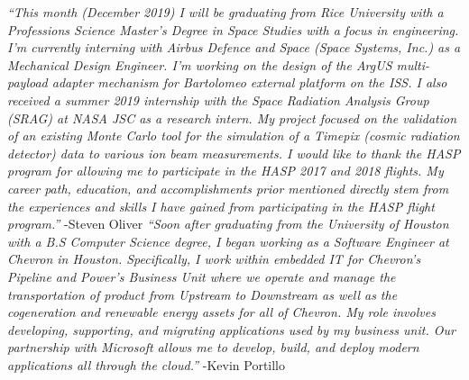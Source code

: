 \begin{appendices}
  \textit{``This month (December 2019) I will be graduating from Rice University with a Professions Science Master's Degree in Space Studies with a focus in engineering. I'm currently interning with Airbus Defence and Space (Space Systems, Inc.) as a Mechanical Design Engineer. I'm working on the design of the ArgUS multi-payload adapter mechanism for Bartolomeo external platform on the ISS. \newline
    I also received a summer 2019 internship with the Space Radiation Analysis Group (SRAG) at NASA JSC as a research intern. My project focused on the validation of an existing Monte Carlo tool for the simulation of a Timepix (cosmic radiation detector) data to various ion beam measurements. \newline
    I would like to thank the HASP program for allowing me to participate in the HASP 2017 and 2018 flights. My career path, education, and accomplishments prior mentioned directly stem from the experiences and skills I have gained from participating in the HASP flight program.''}
  \newline\hspace*{12cm} -Steven Oliver
  \vspace{2cm}
  \textit{``Soon after graduating from the University of Houston with a B.S Computer Science degree, I began working as a Software Engineer at Chevron in Houston. Specifically, I work within embedded IT for Chevron’s Pipeline and Power’s Business Unit where we operate and manage the transportation of product from Upstream to Downstream as well as the cogeneration and renewable energy assets for all of Chevron. My role involves developing, supporting, and migrating applications used by my business unit. Our partnership with Microsoft allows me to develop, build, and deploy modern applications all through the cloud.''}
  \newline\hspace*{12cm} -Kevin Portillo

  
\end{appendices}

